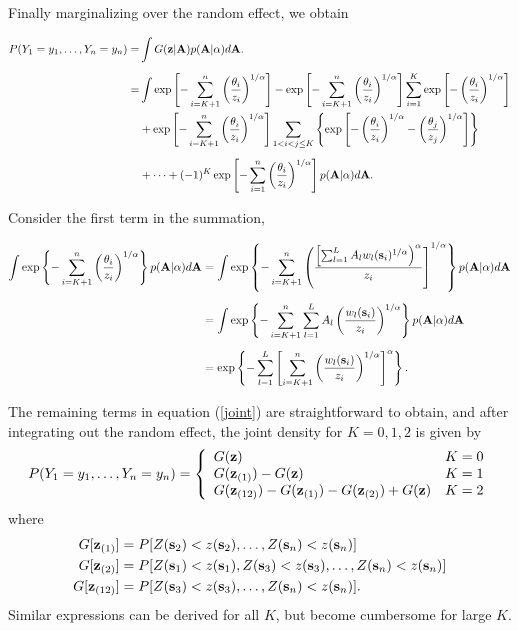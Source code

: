 \documentclass[11pt]{article}
\begin{document}
\begin{}
Finally marginalizing over the random effect, we obtain

\begin{align} \label{joint}
    P(Y_1=y_1,\ldots,Y_n=y_n) =&\int G(\mbox{\bf z} | \mbox{\bf A}) p( \mbox{\bf A} | \alpha) d\mbox{\bf A}. \nonumber\\[0.5em]
			=& \int \exp \left[ -\sum_{ i = K+1}^{ n }\left( \frac{ \theta_i }{ z_i } \right)^{1/\alpha} \right] - \exp \left[ -\sum_{ i = K+1}^{ n }\left( \frac{ \theta_i }{ z_i } \right)^{1/\alpha} \right] \sum_{ i = 1}^{K} \exp\left[ -\left( \frac{ \theta_i }{ z_i } \right)^{ 1/\alpha} \right] \nonumber\\
		&  + \exp \left[ -\sum_{ i = K+1}^{ n }\left( \frac{ \theta_i }{ z_i } \right)^{1/\alpha} \right] \sum_{ 1 < i < j \le K } \left\{ \exp \left[ - \left( \frac{ \theta_i }{ z_i } \right)^{ 1/\alpha} - \left( \frac{ \theta_j }{ z_j } \right)^{ 1/\alpha } \right] \right \} \nonumber \\[0.5em]
		& + \cdots + (-1)^K \exp\left[ - \sum_{ i = 1 }^{ n }\left( \frac{ \theta_i }{ z_i } \right)^{ 1/\alpha} \right] p( \mbox{\bf A} | \alpha) d\mbox{\bf A}.
\end{align}

Consider the first term in the summation,

\begin{align}
	\int \exp \left\{ -\sum_{ i = K+1}^{ n }\left( \frac{ \theta_i }{ z_i } \right)^{1/\alpha} \right\} p( \mbox{\bf A} | \alpha) d\mbox{\bf A} &= \int \exp \left\{ - \sum_{ i = K + 1 }^n \left( \frac{ \left[ \sum_{ l = 1 }^L  A_l w_{l}(\mbox{\bf s}_i)^{1/\alpha} \right)^\alpha }{ z_i} \right]^{ 1/\alpha } \right \} p( \mbox{\bf A} | \alpha) d\mbox{\bf A} \nonumber \\[0.5em]
	 &= \int \exp \left\{ -\sum_{ i = K + 1}^n \sum_{ l = 1}^L A_l \left( \frac{ w_l (\mbox{\bf s}_i) }{ z_i } \right)^{1/\alpha} \right \} p( \mbox{\bf A} | \alpha) d\mbox{\bf A} \nonumber \\[0.5em]
	 &=\exp\left\{-\sum_{ l = 1}^L \left[ \sum_{ i = K + 1 }^n \left( \frac{ w_l(\mbox{\bf s}_i)}{ z_i} \right)^{1/\alpha} \right]^\alpha \right\}.
\end{align}

The remaining terms in equation (\ref{joint}) are straightforward to obtain, and after integrating out the random effect, the joint density for $K = 0, 1, 2$ is given by
\begin{align}\label{pmf}
  P(Y_1=y_1,\ldots,Y_n=y_n) =  \left\{
    \begin{array}{ll}
      G(\mbox{\bf z}) & K=0 \\
      G(\mbox{\bf z}_{(1)})-G(\mbox{\bf z}) & K=1 \\
      G(\mbox{\bf z}_{(12)})-G(\mbox{\bf z}_{(1)})-G(\mbox{\bf z}_{(2)})+G(\mbox{\bf z}) & K=2
    \end{array}
  \right.
\end{align}
where
\begin{align*}
  G[\mbox{\bf z}_{(1)}] &= P[Z(\mbox{\bf s}_2)<z(\mbox{\bf s}_2),\ldots,Z(\mbox{\bf s}_n)<z(\mbox{\bf s}_n)] \\
  G[\mbox{\bf z}_{(2)}] &= P[Z(\mbox{\bf s}_1)<z(\mbox{\bf s}_1),Z(\mbox{\bf s}_3)<z(\mbox{\bf s}_3),\ldots,Z(\mbox{\bf s}_n)<z(\mbox{\bf s}_n)]\\
  G[\mbox{\bf z}_{(12)}] &= P[Z(\mbox{\bf s}_3)<z(\mbox{\bf s}_3),\ldots,Z(\mbox{\bf s}_n)<z(\mbox{\bf s}_n)].
\end{align*}
Similar expressions can be derived for all $K$, but become cumbersome for large $K$.


\end{}
\end{document}
